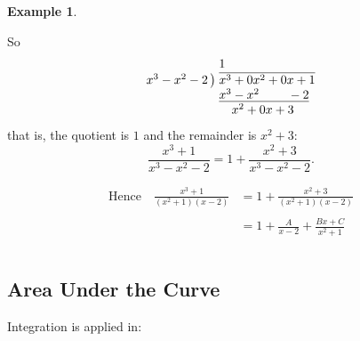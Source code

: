 \documentclass[11pt,a4paper]{article}
\theoremstyle{definition}
\newtheorem{example}[thm]{Example}
\begin{document}
\begin{example}
\begin{enumerate}
So
$$\begin{array}{r@{\;}l}
 & 1\\
x^{3}-x^{2}-2\,\big) & \overline{x^{3}+0x^{2}+0x+1}\\
 & \underline{x^{3}-x^{2}\phantom{{}+0x}-2}\\
 & \phantom{x^{3}}x^{2}+0x+3
\end{array}$$
that is, the quotient is $1$ and the remainder is $x^{2}+3$:
$$\frac{x^{3}+1}{x^{3}-x^{2}-2}=1+\frac{x^{2}+3}{x^{3}-x^{2}-2}.$$

\begin{align*}
\text{Hence}\quad  \frac{x^3 + 1}{\left(x^2 + 1\right) \left( x - 2\right)} & = 1 + \frac{x^2 + 3}{\left(x^2 + 1\right)\left(x - 2\right)}\\\\
& = 1 + \frac{A}{x - 2} + \frac{Bx + C}{x^2 + 1}\\\\
\end{align*}
\end{enumerate}
\end{example}
\subsection{Area Under the Curve}

Integration is applied in:
\end{document}
